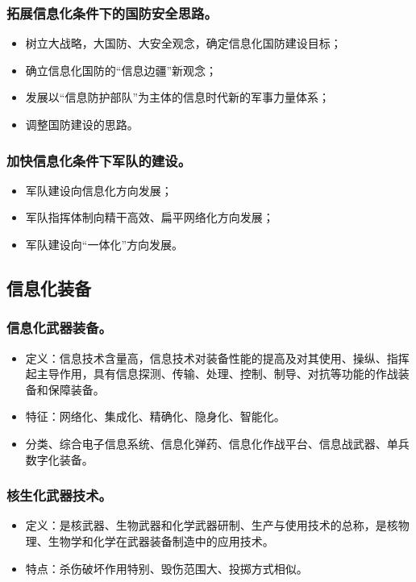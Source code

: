 \documentclass{article}
\begin{document}
\subsubsection{拓展信息化条件下的国防安全思路。}
\begin{itemize}
    \item 树立大战略，大国防、大安全观念，确定信息化国防建设目标；
    \item 确立信息化国防的“信息边疆”新观念；
    \item 发展以“信息防护部队”为主体的信息时代新的军事力量体系；
    \item 调整国防建设的思路。
\end{itemize}

\subsubsection{加快信息化条件下军队的建设。}
\begin{itemize}
    \item 军队建设向信息化方向发展；
    \item 军队指挥体制向精干高效、扁平网络化方向发展；
    \item 军队建设向“一体化”方向发展。
\end{itemize}

\subsection{信息化装备}

\subsubsection{信息化武器装备。}
\begin{itemize}
    \item 定义：信息技术含量高，信息技术对装备性能的提高及对其使用、操纵、指挥起主导作用，具有信息探测、传输、处理、控制、制导、对抗等功能的作战装备和保障装备。
    \item 特征：网络化、集成化、精确化、隐身化、智能化。
    \item 分类、综合电子信息系统、信息化弹药、信息化作战平台、信息战武器、单兵数字化装备。
\end{itemize}

\subsubsection{核生化武器技术。}
\begin{itemize}
    \item 定义：是核武器、生物武器和化学武器研制、生产与使用技术的总称，是核物理、生物学和化学在武器装备制造中的应用技术。
    \item 特点：杀伤破坏作用特别、毁伤范围大、投掷方式相似。
\end{itemize}
\end{document}
